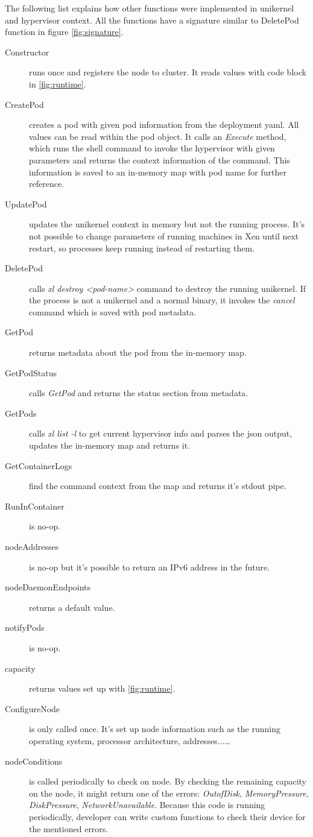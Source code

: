 The following list explains how other functions were implemented in unikernel and hypervisor context. All the functions have a signature similar to DeletePod function in figure \ref{fig:signature}.
\begin{description}
  \item  [Constructor] runs once and registers the node to cluster. It reads values with code block in \ref{fig:runtime}.
  \item [CreatePod] creates a pod with given pod information from the deployment yaml. All values can be read within the pod object. It calls an \textit{Execute} method, which runs the shell command to invoke the hypervisor with given parameters and returns the context information of the command. This information is saved to an in-memory map with pod name for further reference.
  \item [UpdatePod] updates the unikernel context in memory but not the running process. It's not possible to change parameters of running machines in Xen until next restart, so processes keep running instead of restarting them.
  \item [DeletePod] calls \textit{xl destroy <pod-name>} command to destroy the running unikernel. If the process is not a unikernel and a normal binary, it invokes the \textit{cancel} command which is saved with pod metadata.
  \item [GetPod] returns metadata about the pod from the in-memory map.
  \item [GetPodStatus] calls \textit{GetPod} and returns the status section from metadata.
  \item [GetPods] calls \textit{xl list -l} to get current hypervisor info and parses the json output, updates the in-memory map and returns it.
  \item [GetContainerLogs] find the command context from the map and returns it's stdout pipe. 
  \item [RunInContainer] is no-op.
  \item [nodeAddresses] is no-op but it's possible to return an IPv6 address in the future.
  \item [nodeDaemonEndpoints] returns a default value.
  \item [notifyPods] is no-op.
  \item [capacity] returns values set up with \ref{fig:runtime}.
  \item [ConfigureNode] is only called once. It's set up node information such as the running operating system, processor architecture, addresses...\ldots
  \item [nodeConditions] is called periodically to check on node. By checking the remaining capacity on the node, it might return one of the errors: \textit{OutofDisk}, \textit{MemoryPressure}, \textit{DiskPressure}, \textit{NetworkUnavailable}. Because this code is running periodically, developer can write custom functions to check their device for the mentioned errors.
  \end{description}
